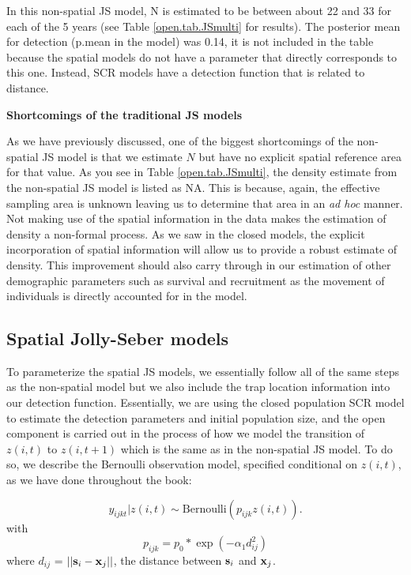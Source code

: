 In this non-spatial JS model, N is estimated to be between about 22 and 33 for each of the 5 years (see
Table \ref{open.tab.JSmulti} for results).  The posterior mean for 
detection (p.mean in the model) was 0.14, it
is not included in the table because the spatial models do not have 
a parameter that directly corresponds to this one.  Instead, SCR models have a detection function
that is related to distance.


{\bf Shortcomings of the traditional JS models}

As we have previously discussed, one of the biggest shortcomings of the non-spatial
JS model is that we estimate $N$ but have no explicit spatial reference area for that
value.  As you see in Table \ref{open.tab.JSmulti}, the density estimate from the non-spatial JS model
is listed as NA.  This is because, again, the effective sampling area is unknown leaving us to
determine that area in an { \it ad hoc} manner.
Not making use of the
spatial information in the data makes
the estimation of density
a non-formal process.  As we saw in the closed models, the explicit
incorporation of spatial information will allow us to provide a robust estimate of density.  
This improvement should
also carry through in our estimation of other demographic parameters
such as survival and recruitment as the movement of individuals is directly accounted for in the
model.


\subsection{Spatial Jolly-Seber models}

To parameterize the spatial JS models, we essentially follow all of the same steps
as the non-spatial model but we also include the trap location information into our
detection function.  Essentially, we are using the closed population SCR model to estimate
the detection parameters and initial population size,
and the open component is carried out in the process of how we model the transition
of $z(i,t)$ to $z(i, t+1)$ which is the same as in the non-spatial JS model.
To do so, we describe the Bernoulli observation model,
specified conditional on $z(i,t)$, as we have done throughout the book:

\[
  y_{ijkt}|z(i,t) \sim
\mbox{Bernoulli}(p_{ijk} z(i,t)).
\]
with
\begin{equation}
p_{ijk} = p_{0}*\exp(-\alpha_{1} d_{ij}^2)
\label{scr0.eq.norm}
\end{equation}
where $d_{ij}$ = $||{\bf s}_{i}-{\bf x}_{j}||$, the distance between
${\bf s}_{i}$ and ${\bf x}_{j}$.

